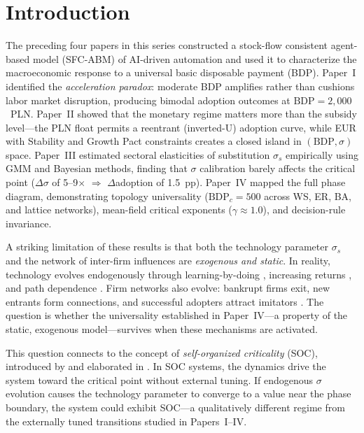 \documentclass[12pt,a4paper]{article}
\begin{document}
\newpage
\tableofcontents
\newpage


\section{Introduction}\label{sec:intro}

The preceding four papers in this series constructed a stock-flow consistent
agent-based model (SFC-ABM) of AI-driven automation and used it to
characterize the macroeconomic response to a universal basic disposable
payment (BDP). Paper~I \parencite{Maciaszek2026a} identified the
\emph{acceleration paradox}: moderate BDP amplifies rather than cushions
labor market disruption, producing bimodal adoption outcomes at
$\mathrm{BDP} = 2{,}000$~PLN. Paper~II \parencite{Maciaszek2026b}
showed that the monetary regime matters more than the subsidy level---the
PLN float permits a reentrant (inverted-U) adoption curve, while EUR with
Stability and Growth Pact constraints creates a closed island in
$(\mathrm{BDP}, \sigma)$ space. Paper~III \parencite{Maciaszek2026c}
estimated sectoral elasticities of substitution $\sigma_s$ empirically
using GMM and Bayesian methods, finding that $\sigma$ calibration barely
affects the critical point ($\Delta\sigma$ of 5--9$\times$ $\Rightarrow$
$\Delta$adoption of 1.5~pp). Paper~IV \parencite{Maciaszek2026d}
mapped the full phase diagram, demonstrating topology universality
($\mathrm{BDP}_c = 500$ across WS, ER, BA, and lattice networks),
mean-field critical exponents ($\gamma \approx 1.0$), and decision-rule
invariance.

A striking limitation of these results is that both the technology parameter
$\sigma_s$ and the network of inter-firm influences are \emph{exogenous and
static}. In reality, technology evolves endogenously through learning-by-doing
\parencite{Arrow1962}, increasing returns \parencite{Arthur1989,Arthur1994},
and path dependence \parencite{David1985}. Firm networks also evolve:
bankrupt firms exit, new entrants form connections, and successful adopters
attract imitators \parencite{Jackson2002, Battiston2012}. The question is
whether the universality established in Paper~IV---a property of the static,
exogenous model---survives when these mechanisms are activated.

This question connects to the concept of \emph{self-organized criticality}
(SOC), introduced by \textcite{Bak1987} and elaborated in \textcite{Bak1996}.
In SOC systems, the dynamics drive the system toward the critical point
without external tuning. If endogenous $\sigma$ evolution causes the
technology parameter to converge to a value near the phase boundary,
the system could exhibit SOC---a qualitatively different regime from
the externally tuned transitions studied in Papers~I--IV.
\end{document}
